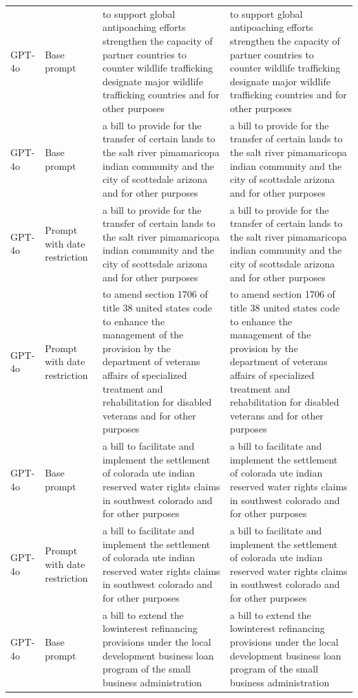 \begin{longtable}{>{\raggedright\arraybackslash}p{1.4cm}>{\raggedright\arraybackslash}p{1.4cm}>{\raggedright\arraybackslash}p{5.5cm}>{\raggedright\arraybackslash}p{5.5cm}}
GPT-4o & Base prompt & to support global antipoaching efforts strengthen the capacity of partner countries to counter wildlife trafficking designate major wildlife trafficking countries and for other purposes & to support global antipoaching efforts strengthen the capacity of partner countries to counter wildlife trafficking designate major wildlife trafficking countries and for other purposes\\
GPT-4o & Base prompt & a bill to provide for the transfer of certain lands to the salt river pimamaricopa indian community and the city of scottsdale arizona and for other purposes & a bill to provide for the transfer of certain lands to the salt river pimamaricopa indian community and the city of scottsdale arizona and for other purposes\\
GPT-4o & Prompt with date restriction & a bill to provide for the transfer of certain lands to the salt river pimamaricopa indian community and the city of scottsdale arizona and for other purposes & a bill to provide for the transfer of certain lands to the salt river pimamaricopa indian community and the city of scottsdale arizona and for other purposes\\
GPT-4o & Prompt with date restriction & to amend section 1706 of title 38 united states code to enhance the management of the provision by the department of veterans affairs of specialized treatment and rehabilitation for disabled veterans and for other purposes & to amend section 1706 of title 38 united states code to enhance the management of the provision by the department of veterans affairs of specialized treatment and rehabilitation for disabled veterans and for other purposes\\
GPT-4o & Base prompt & a bill to facilitate and implement the settlement of colorada ute indian reserved water rights claims in southwest colorado and for other purposes & a bill to facilitate and implement the settlement of colorada ute indian reserved water rights claims in southwest colorado and for other purposes\\
GPT-4o & Prompt with date restriction & a bill to facilitate and implement the settlement of colorada ute indian reserved water rights claims in southwest colorado and for other purposes & a bill to facilitate and implement the settlement of colorada ute indian reserved water rights claims in southwest colorado and for other purposes\\
GPT-4o & Base prompt & a bill to extend the lowinterest refinancing provisions under the local development business loan program of the small business administration & a bill to extend the lowinterest refinancing provisions under the local development business loan program of the small business administration\\

\end{longtable}
